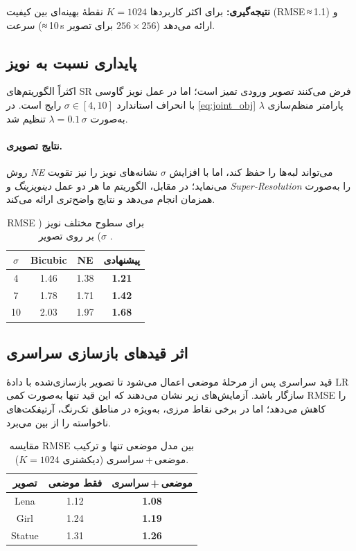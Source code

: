 	\textbf{نتیجه‌گیری:} برای اکثر کاربردها $K=1024$ نقطهٔ بهینه‌ای بین کیفیت (RMSE ≈ 1.1) و سرعت (≈ 10 s برای تصویر $256\times256$) ارائه می‌دهد.
	
	\subsection{پایداری نسبت به نویز}\label{subsec:noise}
	اکثراً الگوریتم‌های SR فرض می‌کنند تصویر ورودی تمیز است؛ اما در عمل نویز گاوسی با انحراف استاندارد $\sigma\in[4,10]$ رایج است. در \eqref{eq:joint_obj} پارامتر منظم‌سازی $\lambda$ به‌صورت $\lambda=0.1\,\sigma$ تنظیم شد.
	
	\paragraph{نتایج تصویری.}
	
	روش \textit{NE} می‌تواند لبه‌ها را حفظ کند، اما با افزایش $\sigma$ نشانه‌های نویز را نیز تقویت می‌نماید؛ در مقابل، الگوریتم ما هر دو عمل \textit{دینویزینگ} و \textit{Super‑Resolution} را به‌صورت همزمان انجام می‌دهد و نتایج واضح‌تری ارائه می‌کند.
	
	\begin{table}[htbp]
		\centering
		\caption{RMSE برای سطوح مختلف نویز ($\sigma$) بر روی تصویر .}
		\label{tab:noise_rmse}
		\begin{tabular}{c|ccc}
			\toprule
			$\sigma$ & Bicubic & NE & پیشنهادی \\
			\midrule
			4  & 1.46 & 1.38 & \textbf{1.21} \\
			7  & 1.78 & 1.71 & \textbf{1.42} \\
			10 & 2.03 & 1.97 & \textbf{1.68} \\
			\bottomrule
		\end{tabular}
	\end{table}
	
	\subsection{اثر قیدهای بازسازی سراسری}\label{subsec:global}
	قید سراسری پس از مرحلهٔ موضعی اعمال می‌شود تا تصویر بازسازی‌شده با دادهٔ LR سازگار باشد. آزمایش‌های زیر نشان می‌دهند که این قید تنها به‌صورت کمی RMSE را کاهش می‌دهد؛ اما در برخی نقاط مرزی، به‌ویژه در مناطق تک‌رنگ، آرتیفکت‌های ناخواسته را از بین می‌برد.
	
	\begin{table}[htbp]
		\centering
		\caption{مقایسه RMSE بین مدل موضعی تنها و ترکیب موضعی + سراسری (دیکشنری $K=1024$).}
		\label{tab:global_rmse}
		\begin{tabular}{c|cc}
			\toprule
			تصویر & فقط موضعی & موضعی + سراسری \\
			\midrule
			Lena   & 1.12 & \textbf{1.08} \\
			Girl   & 1.24 & \textbf{1.19} \\
			Statue & 1.31 & \textbf{1.26} \\
			\bottomrule
		\end{tabular}
	\end{table}
	
